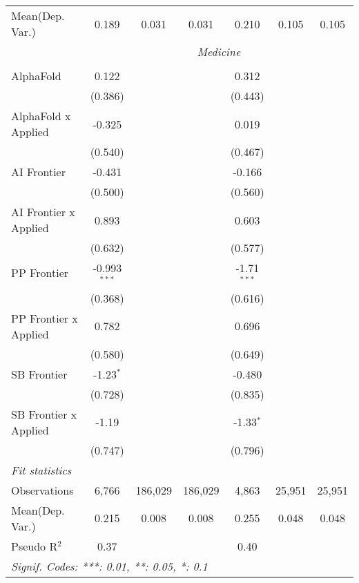 \begin{tabular}{lcccccc}
Mean(Dep. Var.) & 0.189 & 0.031 & 0.031 & 0.210 & 0.105 & 0.105 \\
 & \multicolumn{6}{c}{\textit{Medicine}} \\ \\
   AlphaFold             & 0.122          &         &         & 0.312         &        &   \\   
                         & (0.386)        &         &         & (0.443)       &        &   \\   
   AlphaFold x Applied   & -0.325         &         &         & 0.019         &        &   \\   
                         & (0.540)        &         &         & (0.467)       &        &   \\   
   AI Frontier           & -0.431         &         &         & -0.166        &        &   \\   
                         & (0.500)        &         &         & (0.560)       &        &   \\   
   AI Frontier x Applied & 0.893          &         &         & 0.603         &        &   \\   
                         & (0.632)        &         &         & (0.577)       &        &   \\   
   PP Frontier           & -0.993$^{***}$ &         &         & -1.71$^{***}$ &        &   \\   
                         & (0.368)        &         &         & (0.616)       &        &   \\   
   PP Frontier x Applied & 0.782          &         &         & 0.696         &        &   \\   
                         & (0.580)        &         &         & (0.649)       &        &   \\   
   SB Frontier           & -1.23$^{*}$    &         &         & -0.480        &        &   \\   
                         & (0.728)        &         &         & (0.835)       &        &   \\   
   SB Frontier x Applied & -1.19          &         &         & -1.33$^{*}$   &        &   \\   
                         & (0.747)        &         &         & (0.796)       &        &   \\   
   \midrule
   \emph{Fit statistics}\\
   Observations          & 6,766          & 186,029 & 186,029 & 4,863         & 25,951 & 25,951\\  
Mean(Dep. Var.) & 0.215 & 0.008 & 0.008 & 0.255 & 0.048 & 0.048 \\
   Pseudo R$^2$          & 0.37           &         &         & 0.40          &        & \\  
   \midrule \midrule
   \multicolumn{7}{l}{\emph{Signif. Codes: ***: 0.01, **: 0.05, *: 0.1}}\\
\end{tabular}
\par\endgroup

